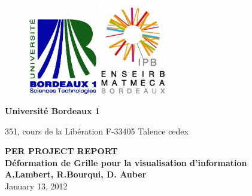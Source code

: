 \begin{titlepage}
  \begin {figure}[ht]
	\includegraphics[angle=0,width=3cm]{img/logobordeaux1.jpg}
        \hspace{11cm}
	\includegraphics[angle=0,width=3cm]{img/logo.jpg}
	\label{logo}
  \end {figure}
  \begin{flushleft}
    \textbf{Université Bordeaux 1}

    351, cours de la Libération 
    F-33405 Talence cedex 
    
  \end{flushleft}
  
  \vspace{4cm}
	\begin{center}
	  {\bf PER PROJECT REPORT}\\
	  \vspace{1cm}
		  {\LARGE\bf Déformation de Grille pour la visualisation d'information}\\
	   \vspace{1cm}
		   {\small\bf A.Lambert, R.Bourqui, D. Auber}\\
\vspace{1cm}
           January 13, 2012

	\end{center}



\end{titlepage}
